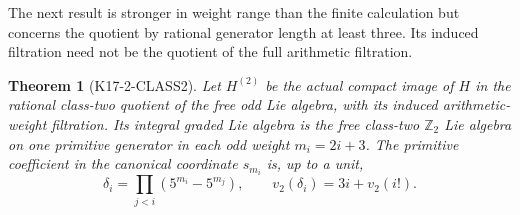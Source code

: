 \documentclass[11pt,a4paper]{article}
\newtheorem{theorem}{Theorem}[section]
\theoremstyle{definition}
\begin{document}
The next result is stronger in weight range than the finite
calculation but concerns the quotient by rational generator
length at least three. Its induced filtration need not be the
quotient of the full arithmetic filtration.

\begin{theorem}[K17-2-CLASS2]\label{thm:2-class2}
Let $H^{(2)}$ be the actual compact image of $H$ in the rational
class-two quotient of the free odd Lie algebra, with its induced
arithmetic-weight filtration. Its integral graded Lie algebra
is the free class-two $\mathbb Z_2$ Lie algebra on one primitive
generator in each odd weight $m_i=2i+3$. The primitive coefficient
in the canonical coordinate $s_{m_i}$ is, up to a unit,
\[
 \delta_i=\prod_{j<i}(5^{m_i}-5^{m_j}),\qquad
 v_2(\delta_i)=3i+v_2(i!).
\]
\end{theorem}
\end{document}
